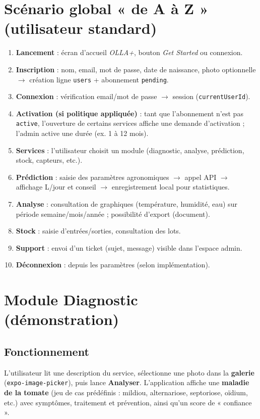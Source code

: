 \documentclass[12pt,a4paper,twoside,openright]{report}
\begin{document}
\section{Scénario global « de A à Z » (utilisateur standard)}

\begin{enumerate}
  \item \textbf{Lancement} : écran d'accueil \textit{OLLA+}, bouton \textit{Get Started} ou connexion.
  \item \textbf{Inscription} : nom, email, mot de passe, date de naissance, photo optionnelle $\rightarrow$ création ligne \texttt{users} + abonnement \texttt{pending}.
  \item \textbf{Connexion} : vérification email/mot de passe $\rightarrow$ session (\texttt{currentUserId}).
  \item \textbf{Activation (si politique appliquée)} : tant que l'abonnement n'est pas \texttt{active}, l'ouverture de certains services affiche une demande d'activation ; l'admin active une durée (ex. 1 à 12 mois).
  \item \textbf{Services} : l'utilisateur choisit un module (diagnostic, analyse, prédiction, stock, capteurs, etc.).
  \item \textbf{Prédiction} : saisie des paramètres agronomiques $\rightarrow$ appel API $\rightarrow$ affichage L/jour et conseil $\rightarrow$ enregistrement local pour statistiques.
  \item \textbf{Analyse} : consultation de graphiques (température, humidité, eau) sur période semaine/mois/année ; possibilité d'export (document).
  \item \textbf{Stock} : saisie d'entrées/sorties, consultation des lots.
  \item \textbf{Support} : envoi d'un ticket (sujet, message) visible dans l'espace admin.
  \item \textbf{Déconnexion} : depuis les paramètres (selon implémentation).
\end{enumerate}

\section{Module Diagnostic (démonstration)}

\subsection{Fonctionnement}
L'utilisateur lit une description du service, sélectionne une photo dans la \textbf{galerie} (\texttt{expo-image-picker}), puis lance \textbf{Analyser}. L'application affiche une \textbf{maladie de la tomate} (jeu de cas prédéfinis : mildiou, alternariose, septoriose, oïdium, etc.) avec symptômes, traitement et prévention, ainsi qu'un score de « confiance ».
\end{document}
